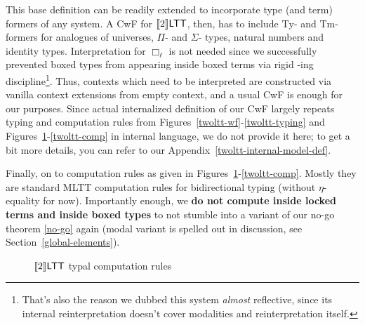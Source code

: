 This base definition can be readily extended to
incorporate type (and term) formers of any system. A
CwF for $\llbracket 2\rrbracket\mathsf{LTT}$, then, has to include $\mathrm{Ty}$-
and $\mathrm{Tm}$- formers for analogues of universes,
$\Pi$- and $\Sigma$- types, natural numbers and
identity types. Interpretation for $\Box_\ell$ is not
needed since we successfully prevented boxed types from
appearing inside boxed terms via rigid \faLock-ing
discipline\footnote{That's also the reason we dubbed
this system \textit{almost} reflective, since its
internal reinterpretation doesn't cover modalities and
reinterpretation itself.}. Thus, contexts which need to
be interpreted are constructed via vanilla context
extensions from empty context, and a usual CwF is
enough for our purposes. Since actual internalized
definition of our CwF largely repeats typing and
computation rules from
Figures~\ref{twoltt-wf}-\ref{twoltt-typing} and
Figures~\ref{twoltt-typcomp}-\ref{twoltt-comp} in
internal language, we do not provide it here; to get a
bit more details, you can refer to our
Appendix~\ref{twoltt-internal-model-def}.

Finally, on to computation rules as given in
Figures~\ref{twoltt-typcomp}-\ref{twoltt-comp}.
Mostly they are standard MLTT computation rules for
bidirectional typing (without $\eta$-equality for now).
Importantly enough, we \textbf{do not compute inside
locked terms and inside boxed types} to not
stumble into a variant of our no-go theorem \ref{no-go}
again (modal variant is spelled out in discussion, see
Section~\ref{global-elements}).

\begin{figure}
\centering
{}
    \caption{$\llbracket 2\rrbracket\mathsf{LTT}$ typal computation rules}
\label{twoltt-typcomp}
\end{figure}

